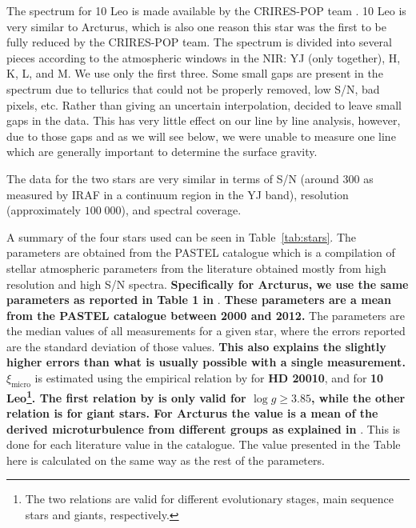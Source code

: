 \documentclass{aa}
\begin{document}
The spectrum for 10 Leo is made available by the CRIRES-POP team
\citep{Nicholls2017}. 10 Leo is very similar to Arcturus, which is also one
reason this star was the first to be fully reduced by the CRIRES-POP team. The
spectrum is divided into several pieces according to the atmospheric windows in
the NIR: YJ (only together), H, K, L, and M. We use only the first three. Some
small gaps are present in the spectrum due to tellurics that could not be
properly removed, low S/N, bad pixels, etc. Rather than giving an uncertain
interpolation, \citet{Nicholls2017} decided to leave small gaps in the data.
This has very little effect on our line by line analysis, however, due to those
gaps and as we will see below, we were unable to measure one  line which are generally
important to determine the surface gravity.

The data for the two stars are very similar in terms of S/N (around 300 as
measured by IRAF in a continuum region in the YJ band), resolution
(approximately $100\;000$), and spectral coverage.

A summary of the four stars used can be seen in Table~\ref{tab:stars}. The parameters are obtained
from the PASTEL catalogue \citep{Soubiran2016} which is a compilation of stellar atmospheric
parameters from the literature obtained mostly from high resolution and high S/N spectra. {\bf
Specifically for Arcturus, we use the same parameters as reported in Table 1 in} \citet{Jofre2014}.
{\bf These parameters are a mean from the PASTEL catalogue between 2000 and 2012.} The parameters
are the median values of all measurements for a given star, where the errors reported are the
standard deviation of those values. {\bf This also explains the slightly higher errors than what is
usually possible with a single measurement.} $\xi_\mathrm{micro}$ is estimated using the empirical
relation by \citet{Tsantaki2013} for {\bf HD 20010}, and \citet{Adibekyan2015} for {\bf 10
Leo\footnote{The two relations are valid for different evolutionary stages, main sequence stars and
giants, respectively.}. The first relation by \citet{Tsantaki2013} is only valid for $\log
g\ge3.85$, while the other relation is for giant stars. For Arcturus the value is a mean of the
derived microturbulence from different groups as explained in} \citet{Jofre2014}. This is done for
each literature value in the catalogue. The value presented in the Table here is calculated on the
same way as the rest of the parameters.
\end{document}
